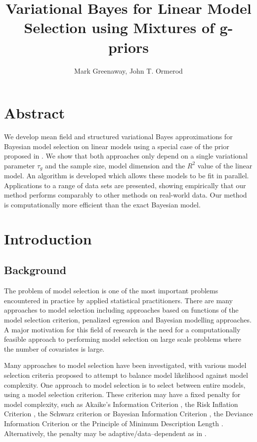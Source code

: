\documentclass{amsart}[12pt]
\title{Variational Bayes for Linear Model Selection using Mixtures of g-priors}
\author{Mark Greenaway, John T. Ormerod}
\begin{document}

\section*{Abstract}


We develop mean field and structured variational Bayes approximations for Bayesian model selection on linear
models using a special case of the prior proposed in \cite{Maruyama2011}. We show that both approaches only
depend on a single variational parameter $\tau_g$ and the sample size, model dimension and the $R^2$ value of
the linear model. An algorithm is developed which allows these models to be fit in parallel. Applications to a
range of data sets are presented, showing  empirically that our method performs comparably to other methods on
real-world data. Our method is computationally more efficient  than the exact Bayesian model.

\section{Introduction}

\subsection{Background}


The problem of model selection is one of the most important problems encountered in practice by applied
statistical practitioners. There are many approaches to model selection including approaches based on
functions of the model selection criterion, penalized egression and Bayesian modelling approaches. A major
motivation for this field of research is the need for a computationally feasible approach to performing model
selection on large scale problems where the number of covariates is large.


Many approaches to model selection have been investigated, with various model selection criteria
proposed to attempt to balance model likelihood against model complexity. One approach to model selection is
to select between entire models, using a model selection criterion. These criterion may have a fixed penalty
for model complexity, such as Akaike's Information Criterion \citep{Akaike1974}, the Risk Inflation Criterion
\citep{Foster1994}, the Schwarz criterion or Bayesian Information Criterion \citep{Schwarz1978}, the Deviance
Information Criterion \citep{Spiegelhalter2016} or the Principle of Minimum Description Length
\citep{Hansen2001}. Alternatively, the penalty may be adaptive/data--dependent as in \citep{George2000}.
\end{document}
